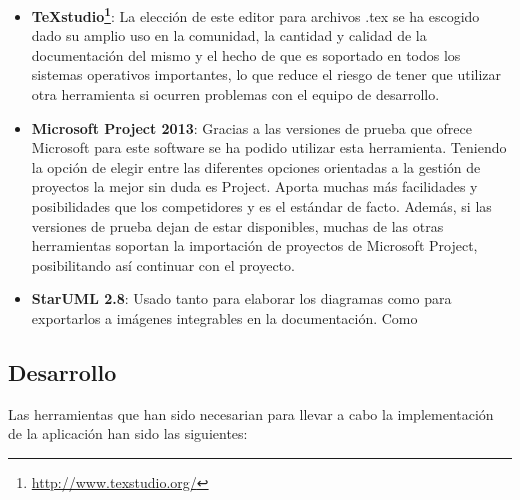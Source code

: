 \begin{itemize}
	\item \textbf{TeXstudio\footnote{\url{http://www.texstudio.org/}}}: La elección de este editor para archivos .tex se ha escogido dado su amplio uso en la comunidad, la cantidad y calidad de la documentación del mismo y el hecho de que es soportado en todos los sistemas operativos importantes, lo que reduce el riesgo de tener que utilizar otra herramienta si ocurren problemas con el equipo de desarrollo.
	\item \textbf{Microsoft Project 2013}: Gracias a las versiones de prueba que ofrece Microsoft para este software se ha podido utilizar esta herramienta. Teniendo la opción de elegir entre las diferentes opciones orientadas a la gestión de proyectos la mejor sin duda es Project. Aporta muchas más facilidades y posibilidades que los competidores y es el estándar de facto. Además, si las versiones de prueba dejan de estar disponibles, muchas de las otras herramientas soportan la importación de proyectos de Microsoft Project, posibilitando así continuar con el proyecto.
	\item \textbf{StarUML 2.8}: Usado tanto para elaborar los diagramas como para exportarlos a imágenes integrables en la documentación. Como 
\end{itemize}


\subsection{Desarrollo}

Las herramientas que han sido necesarian para llevar a cabo la implementación de la aplicación han sido las siguientes:

